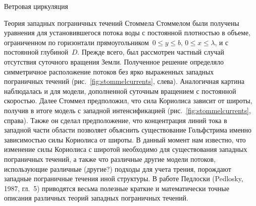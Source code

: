 \begin{chapter}{Ветровая циркуляция}
\begin{section}{Теория западных пограничных течений Стоммела}
Стоммелом были получены уравнения для установившегося потока воды с постоянной 
плотностью в объеме, ограниченном по горизонтали 
прямоугольником~$0\leq y\leq b$, $0\leq x\leq \lambda$, и с постоянной 
глубиной~$D$. Прежде всего, был рассмотрен частный случай отсутствия суточного
вращения Земли. Полученное решение определяло симметричное расположение 
потоков без ярко выраженных западных пограничных течений
(рис.~\ref{fig:stommelcurrents}, слева). Аналогичная картина наблюдалась
и для модели, дополненной суточным вращением с постоянной скоростью. Далее
Стоммел предположил, что сила Кориолиса зависит от широты, получив в итоге
модель с западной интенсификацией (рис.~\ref{fig:stommelcurrents}, справа). 
Также он сделал предположение, что концентрация линий тока в западной 
части области позволяет объяснить существование 
Гольфстрима
именно зависимостью силы Кориолиса от широты. В данный момент нам известно,
что изменение силы Кориолиса с широтой необходимо для существования западных
пограничных течений, а также что различные другие модели потоков, использующие
различные (другие?) подходы для учета трения, порождают западные пограничные
течения иной структуры. В работе Педлоски (Pedlosky, 1987, гл.~5) приводятся
весьма полезные краткие и математически точные описания различных теорий
западных пограничных течений.
%


\end{section}
\end{chapter}
